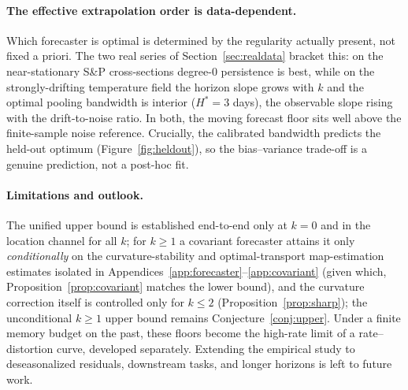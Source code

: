 \documentclass[11pt]{article}
\theoremstyle{definition}
\theoremstyle{remark}
\begin{document}
\paragraph{The effective extrapolation order is data-dependent.} Which forecaster is optimal is
determined by the regularity actually present, not fixed a priori. The two real series of
Section~\ref{sec:realdata} bracket this: on the near-stationary S\&P cross-sections degree-$0$
persistence is best, while on the strongly-drifting temperature field the horizon slope grows with
$k$ and the optimal pooling bandwidth is interior ($H^*=3$ days), the observable slope rising with the
drift-to-noise ratio. In both, the moving forecast floor sits well above the finite-sample noise
reference. Crucially, the calibrated bandwidth predicts the held-out optimum
(Figure~\ref{fig:heldout}), so the bias--variance trade-off is a genuine prediction, not a post-hoc
fit.

\paragraph{Limitations and outlook.} The unified upper bound is established end-to-end only at
$k=0$ and in the location channel for all $k$; for $k\ge1$ a covariant forecaster attains it only
\emph{conditionally} on the curvature-stability and optimal-transport map-estimation estimates
isolated in Appendices~\ref{app:forecaster}--\ref{app:covariant} (given which,
Proposition~\ref{prop:covariant} matches the lower bound), and the curvature correction itself is
controlled only for $k\le2$ (Proposition~\ref{prop:sharp}); the unconditional $k\ge1$ upper bound
remains Conjecture~\ref{conj:upper}. Under a finite memory budget on the past, these floors become
the high-rate limit of a rate--distortion curve, developed separately. Extending the empirical study
to deseasonalized residuals, downstream tasks, and longer horizons is left to future work.
\end{document}
